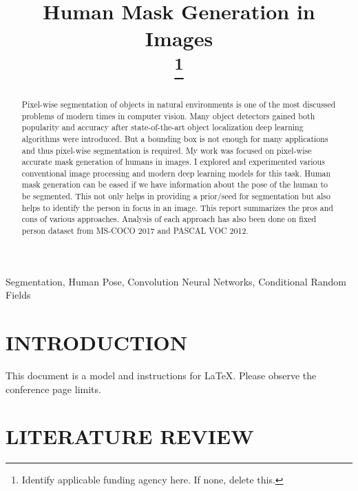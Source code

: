 \documentclass[conference]{IEEEtran}
\begin{document}
\title{Human Mask Generation in Images\\
\thanks{Identify applicable funding agency here. If none, delete this.}
}

\author{
}

\maketitle

\begin{abstract}
Pixel-wise segmentation of objects in natural environments is one of the most discussed problems of modern times in computer vision. Many object detectors gained both popularity and accuracy after state-of-the-art object localization deep learning algorithms were introduced. But a bounding box is not enough for many applications and thus pixel-wise segmentation is required. My work was focused on pixel-wise accurate mask generation of humans in images. I explored and experimented various conventional image processing and modern deep learning models for this task. Human mask generation can be eased if we have information about the pose of the human to be segmented. This not only helps in providing a prior/seed for segmentation but also helps to identify the person in focus in an image. This report summarizes the pros and cons of various approaches. Analysis of each approach has also been done on fixed person dataset from MS-COCO 2017 and PASCAL VOC 2012.\\ 
\end{abstract}
\begin{IEEEkeywords}
Segmentation, Human Pose, Convolution Neural Networks, Conditional Random Fields
\end{IEEEkeywords}

\section{INTRODUCTION}
This document is a model and instructions for \LaTeX.
Please observe the conference page limits. 

\section{LITERATURE REVIEW}
\end{document}
